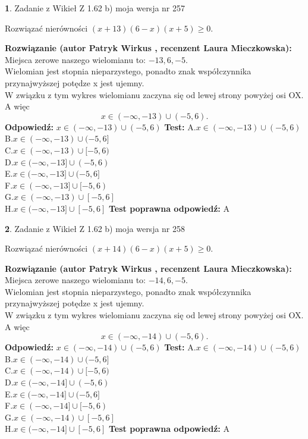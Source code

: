 \documentclass[12pt, a4paper]{article}
\theoremstyle{definition} %
\newtheorem{zad}{}
\newcommand{\zadStart}[1]{\begin{zad}#1\newline}
\newcommand{\zadStop}{\end{zad}}
\newcommand{\rozwStart}[2]{\noindent \textbf{Rozwiązanie (autor #1 , recenzent #2): }\newline}
\newcommand{\rozwStop}{\newline}
\newcommand{\odpStart}{\noindent \textbf{Odpowiedź:}\newline}
\newcommand{\odpStop}{\newline}
\newcommand{\testStart}{\noindent \textbf{Test:}\newline}
\newcommand{\testStop}{\newline}
\newcommand{\kluczStart}{\noindent \textbf{Test poprawna odpowiedź:}\newline}
\newcommand{\kluczStop}{\newline}
\begin{document}
\zadStart{Zadanie z Wikieł Z 1.62 b) moja wersja nr 257}

Rozwiązać nierówności $(x+13)(6-x)(x+5)\ge0$.
\zadStop
\rozwStart{Patryk Wirkus}{Laura Mieczkowska}
Miejsca zerowe naszego wielomianu to: $-13, 6, -5$.\\
Wielomian jest stopnia nieparzystego, ponadto znak współczynnika przy\linebreak najwyższej potędze x jest ujemny.\\ W związku z tym wykres wielomianu zaczyna się od lewej strony powyżej osi OX. A więc $$x \in (-\infty,-13) \cup (-5,6).$$
\rozwStop
\odpStart
$x \in (-\infty,-13) \cup (-5,6)$
\odpStop
\testStart
A.$x \in (-\infty,-13) \cup (-5,6)$\\
B.$x \in (-\infty,-13) \cup (-5,6]$\\
C.$x \in (-\infty,-13) \cup [-5,6)$\\
D.$x \in (-\infty,-13] \cup (-5,6)$\\
E.$x \in (-\infty,-13] \cup (-5,6]$\\
F.$x \in (-\infty,-13] \cup [-5,6)$\\
G.$x \in (-\infty,-13) \cup [-5,6]$\\
H.$x \in (-\infty,-13] \cup [-5,6]$
\testStop
\kluczStart
A
\kluczStop



\zadStart{Zadanie z Wikieł Z 1.62 b) moja wersja nr 258}

Rozwiązać nierówności $(x+14)(6-x)(x+5)\ge0$.
\zadStop
\rozwStart{Patryk Wirkus}{Laura Mieczkowska}
Miejsca zerowe naszego wielomianu to: $-14, 6, -5$.\\
Wielomian jest stopnia nieparzystego, ponadto znak współczynnika przy\linebreak najwyższej potędze x jest ujemny.\\ W związku z tym wykres wielomianu zaczyna się od lewej strony powyżej osi OX. A więc $$x \in (-\infty,-14) \cup (-5,6).$$
\rozwStop
\odpStart
$x \in (-\infty,-14) \cup (-5,6)$
\odpStop
\testStart
A.$x \in (-\infty,-14) \cup (-5,6)$\\
B.$x \in (-\infty,-14) \cup (-5,6]$\\
C.$x \in (-\infty,-14) \cup [-5,6)$\\
D.$x \in (-\infty,-14] \cup (-5,6)$\\
E.$x \in (-\infty,-14] \cup (-5,6]$\\
F.$x \in (-\infty,-14] \cup [-5,6)$\\
G.$x \in (-\infty,-14) \cup [-5,6]$\\
H.$x \in (-\infty,-14] \cup [-5,6]$
\testStop
\kluczStart
A
\kluczStop
\end{document}
